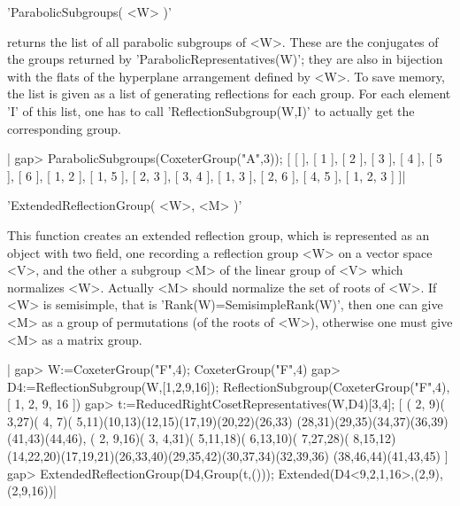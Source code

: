 
'ParabolicSubgroups( <W> )'

returns  the  list  of  all  parabolic  subgroups  of  <W>.  These  are the
conjugates  of the  groups returned  by 'ParabolicRepresentatives(W)'; they
are  also in bijection with the flats of the hyperplane arrangement defined
by  <W>.  To  save  memory,  the  list  is  given  as  a list of generating
reflections  for each group. For each element  'I' of this list, one has to
call 'ReflectionSubgroup(W,I)' to actually get the corresponding group.

|    gap> ParabolicSubgroups(CoxeterGroup("A",3));
    [ [  ], [ 1 ], [ 2 ], [ 3 ], [ 4 ], [ 5 ], [ 6 ], [ 1, 2 ], [ 1, 5 ],
      [ 2, 3 ], [ 3, 4 ], [ 1, 3 ], [ 2, 6 ], [ 4, 5 ], [ 1, 2, 3 ] ]|


'ExtendedReflectionGroup( <W>, <M> )'

This function creates an extended reflection group, which is represented as
an  object with two field, one recording a reflection group <W> on a vector
space  <V>, and the other  a subgroup <M> of  the linear group of <V> which
normalizes  <W>. Actually <M> should normalize the  set of roots of <W>. If
<W>  is semisimple, that is  'Rank(W)=SemisimpleRank(W)', then one can give
<M>  as a group of  permutations (of the roots  of <W>), otherwise one must
give <M> as a matrix group.

|    gap> W:=CoxeterGroup("F",4);
    CoxeterGroup("F",4)
    gap> D4:=ReflectionSubgroup(W,[1,2,9,16]);
    ReflectionSubgroup(CoxeterGroup("F",4), [ 1, 2, 9, 16 ])
    gap> t:=ReducedRightCosetRepresentatives(W,D4){[3,4]};
    [ ( 2, 9)( 3,27)( 4, 7)( 5,11)(10,13)(12,15)(17,19)(20,22)(26,33)
        (28,31)(29,35)(34,37)(36,39)(41,43)(44,46),
      ( 2, 9,16)( 3, 4,31)( 5,11,18)( 6,13,10)( 7,27,28)( 8,15,12)
        (14,22,20)(17,19,21)(26,33,40)(29,35,42)(30,37,34)(32,39,36)
        (38,46,44)(41,43,45) ]
    gap> ExtendedReflectionGroup(D4,Group(t,()));
    Extended(D4<9,2,1,16>,(2,9),(2,9,16))|

